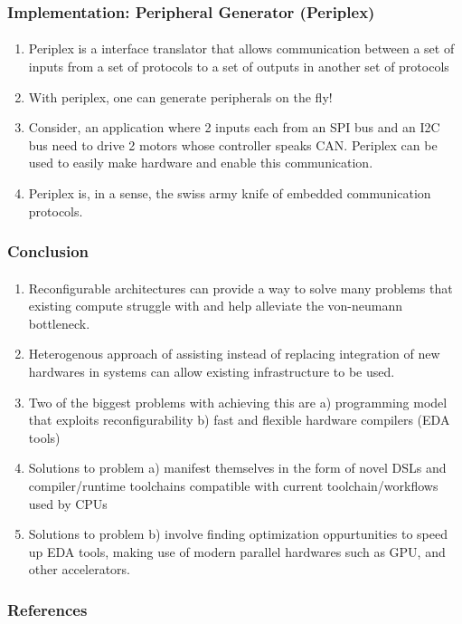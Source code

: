 \documentclass{beamer}
\begin{document}
\begin{frame}[fragile]
  \frametitle{Implementation: Peripheral Generator (Periplex)}
  \framesubtitle{}

  \begin{enumerate}
    \item Periplex is a interface translator that allows communication
      between a set of inputs from a set of protocols to a set of outputs
      in another set of protocols
    \item With periplex, one can generate peripherals on the fly!
    \item Consider, an application where 2 inputs each from an SPI bus and an
      I2C bus need to drive 2 motors whose controller speaks CAN. Periplex can
      be used to easily make hardware and enable this communication.
    \item Periplex is, in a sense, the swiss army knife of embedded
      communication protocols.
  \end{enumerate}
\end{frame}

\begin{frame}[fragile]
  \frametitle{Conclusion}
  \framesubtitle{}

  \begin{enumerate}
    \item Reconfigurable architectures can provide a way to solve many problems
      that existing compute struggle with and help alleviate the von-neumann
      bottleneck.
    \item Heterogenous approach of assisting instead of replacing integration of
      new hardwares in systems can allow existing infrastructure to be used.
    \item Two of the biggest problems with achieving this are a) programming
      model that exploits reconfigurability b) fast and flexible hardware
      compilers (EDA tools)
    \item Solutions to problem a) manifest themselves in the form of novel DSLs
      and compiler/runtime toolchains compatible with current
      toolchain/workflows used by CPUs
    \item Solutions to problem b) involve finding optimization oppurtunities
      to speed up EDA tools, making use of modern parallel hardwares such as
      GPU, and other accelerators.
  \end{enumerate}
\end{frame}

\begin{frame}[allowframebreaks]
\frametitle{References}
\printbibliography
\end{frame}
\end{document}

